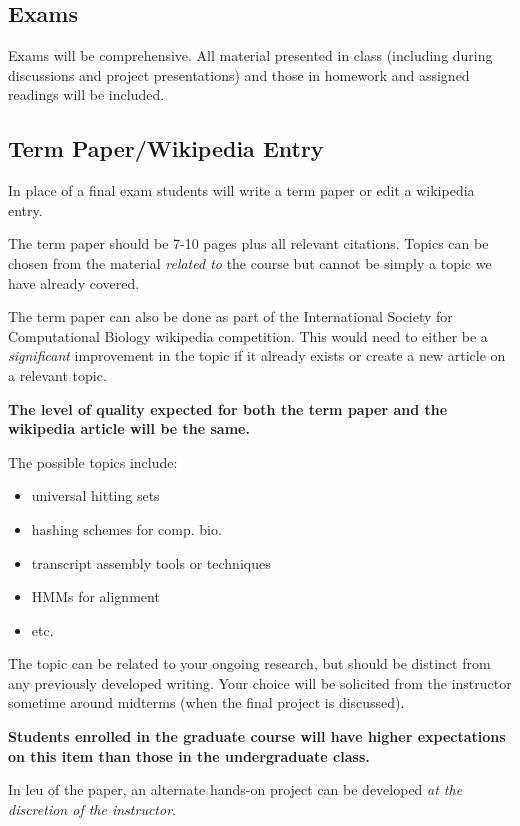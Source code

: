 \documentclass[12pt]{scrartcl}
\begin{document}
\subsection{Exams}

Exams will be comprehensive. 
All material presented in class (including during discussions and project presentations) 
and those in homework and assigned readings will be included.

\subsection{Term Paper/Wikipedia Entry}

In place of a final exam students will write a term paper or edit a wikipedia entry. 

The term paper should be 7-10 pages plus all relevant citations.
Topics can be chosen from the material \textit{related to} the course but cannot be simply a topic we have already covered. 

The term paper can also be done as part of the International Society for Computational Biology wikipedia competition.
This would need to either be a \textit{significant} improvement in the topic if it already exists or create a new article on a relevant topic. 

\textbf{The level of quality expected for both the term paper and the wikipedia article will be the same.}

The possible topics include: 
\begin{itemize}
\item universal hitting sets
\item hashing schemes for comp. bio. 
\item transcript assembly tools or techniques
\item HMMs for alignment
\item etc. 
\end{itemize}
The topic can be related to your ongoing research, but should be distinct from any previously developed writing. 
Your choice will be solicited from the instructor sometime around midterms (when the final project is discussed). 

\textbf{Students enrolled in the graduate course will have higher expectations on this item than those in the undergraduate class.}

In leu of the paper, an alternate hands-on project can be developed \textit{at the discretion of the instructor}. 
\end{document}
